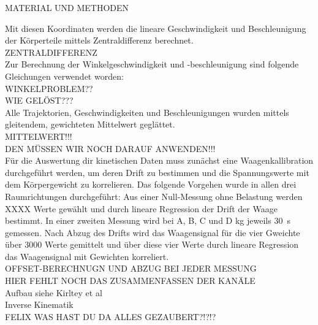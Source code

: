 MATERIAL UND METHODEN

Mit diesen Koordinaten werden die lineare Geschwindigkeit und Beschleunigung der Körperteile mittels Zentraldifferenz berechnet.\\
ZENTRALDIFFERENZ\\

Zur Berechnung der Winkelgeschwindigkeit und -beschleunigung sind folgende Gleichungen verwendet worden:\\
WINKELPROBLEM??\\
WIE GELÖST???\\

Alle Trajektorien, Geschwindigkeiten und Beschleunigungen wurden mittels gleitendem, gewichteten Mittelwert geglättet.\\
MITTELWERT!!!\\
DEN MÜSSEN WIR NOCH DARAUF ANWENDEN!!!\\
Für die Auswertung dir kinetischen Daten muss zunächst eine Waagenkallibration durchgeführt werden, um deren Drift zu bestimmen und die Spannungswerte mit dem Körpergewicht zu korrelieren. Das folgende Vorgehen wurde in allen drei Raumrichtungen durchgeführt: Aus einer Null-Messung ohne Belastung werden XXXX Werte gewählt und durch lineare Regression der Drift der Waage bestimmt. In einer zweiten Messung wird bei A, B, C und D kg jeweils 30~s gemessen. Nach Abzug des Drifts wird das Waagensignal für die vier Gweichte über 3000 Werte gemittelt und über diese vier Werte durch lineare Regression das Waagensignal mit Gewichten korreliert.\\
OFFSET-BERECHNUGN UND ABZUG BEI JEDER MESSUNG\\
HIER FEHLT NOCH DAS ZUSAMMENFASSEN DER KANÄLE\\


Aufbau siehe Kirltey et al\\
Inverse Kinematik\\
FELIX WAS HAST DU DA ALLES GEZAUBERT?!?!?

